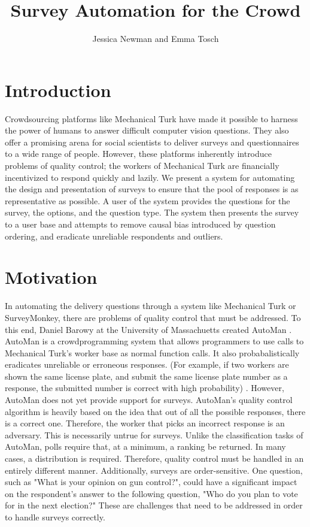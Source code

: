 \documentclass{article}
\begin{document}
\title{Survey Automation for the Crowd}
\author{Jessica Newman and Emma Tosch}
\maketitle
\section{Introduction}
Crowdsourcing platforms like Mechanical Turk have made it possible to harness the power of humans to answer difficult computer vision questions. They also offer a promising arena for social scientists to deliver surveys and questionnaires to a wide range of people. However, these platforms inherently introduce problems of quality control; the workers of Mechanical Turk are financially incentivized to respond quickly and lazily. We present a system for automating the design and presentation of surveys to ensure that the pool of responses is as representative as possible. A user of the system provides the questions for the survey, the options, and the question type. The system then presents the survey to a user base and attempts to remove causal bias introduced by question ordering, and eradicate unreliable respondents and outliers.
\section{Motivation}
In automating the delivery questions through a system like Mechanical Turk or SurveyMonkey, there are problems of quality control that must be addressed. To this end, Daniel Barowy at the University of Massachuetts created AutoMan \cite{automan}. AutoMan is a crowdprogramming system that allows programmers to use calls to Mechanical Turk's worker base as normal function calls. It also probabalistically eradicates unreliable or erroneous responses. (For example, if two workers are shown the same license plate, and submit the same license plate number as a response, the submitted number is correct with high probability) \cite{automan}. However, AutoMan does not yet provide support for surveys. AutoMan's quality control algorithm is heavily based on the idea that out of all the possible responses, there is a correct one. Therefore, the worker that picks an incorrect response is an adversary. This is necessarily untrue for surveys. Unlike the classification tasks of AutoMan, polls require that, at a minimum, a ranking be returned. In many cases, a distribution is required. Therefore, quality control must be handled in an entirely different manner. Additionally, surveys are order-sensitive. One question, such as "What is your opinion on gun control?", could have a significant impact on the respondent's answer to the following question, "Who do you plan to vote for in the next election?" These are challenges that need to be addressed in order to handle surveys correctly.
\end{document}
